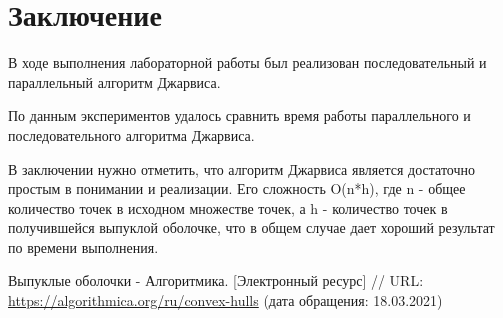 \documentclass{report}
\begin{document}
\section*{Заключение}
В ходе выполнения лабораторной работы был реализован последовательный и параллельный алгоритм Джарвиса.
\par По данным экспериментов удалось сравнить время работы параллельного и последовательного алгоритма Джарвиса.
\par В заключении нужно отметить, что алгоритм Джарвиса является достаточно простым в понимании и реализации. Его сложность O(n*h), где n - общее количество точек в исходном множестве точек, а h - количество точек в получившейся выпуклой оболочке, что в общем случае дает хороший результат по времени выполнения.
\newpage

\begin{thebibliography}{1}
 Выпуклые оболочки - Алгоритмика. [Электронный ресурс] // URL: \url {https://algorithmica.org/ru/convex-hulls} (дата обращения: 18.03.2021)
\end{thebibliography}
\newpage

\end{document}
